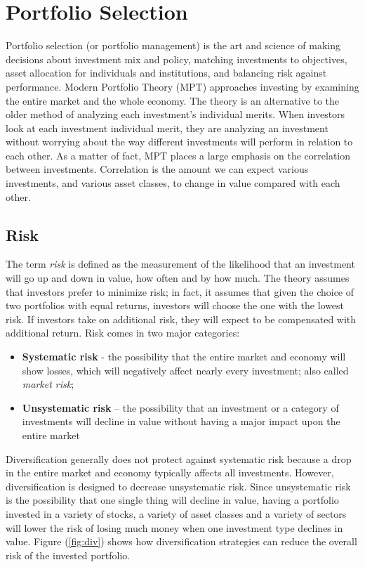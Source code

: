\section{Portfolio Selection}
Portfolio selection (or portfolio management) is the art and science of making decisions about investment mix and policy, matching investments to objectives, asset allocation for individuals and institutions, and balancing risk against performance. Modern Portfolio Theory (MPT) approaches investing by examining the entire market and the whole economy. The theory is an alternative to the older method of analyzing each investment’s individual merits. When investors look at each investment individual merit, they are analyzing an investment without worrying about the way different investments will perform in relation to each other. As a matter of fact, MPT places a large emphasis on the correlation between investments. Correlation is the amount we can expect various investments, and various asset classes, to change in value compared with each other. 

\subsection{Risk}
The term \textit{risk} is defined as the measurement of the likelihood that an investment will go up and down in value, how often and by how much. The theory assumes that investors prefer to minimize risk; in fact, it assumes that given the choice of two portfolios with equal returns, investors will choose the one with the lowest risk. If investors take on additional risk, they will expect to be compensated with additional return. Risk comes in two major categories:
\begin{itemize}
\item \textbf{Systematic risk} - the possibility that the entire market and economy will show losses, which will negatively affect nearly every investment; also called \textit{market risk};
\item \textbf{Unsystematic risk} – the possibility that an investment or a category of investments will decline in value without having a major impact upon the entire market
\end{itemize}
Diversification generally does not protect against systematic risk because a drop in the entire market and economy typically affects all investments. However, diversification is designed to decrease unsystematic risk. Since unsystematic risk is the possibility that one single thing will decline in value, having a portfolio invested in a variety of stocks, a variety of asset classes and a variety of sectors will lower the risk of losing much money when one investment type declines in value. Figure (\ref{fig:div}) shows how diversification strategies can reduce the overall risk of the invested portfolio.

